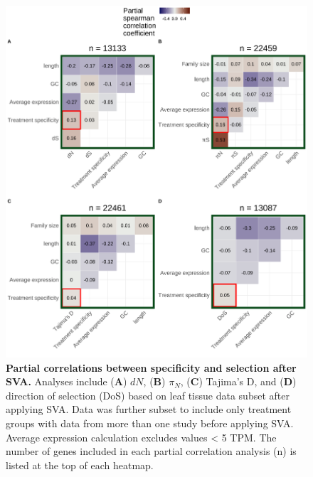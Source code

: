 \documentclass[12pt]{article}
\begin{document}
\begin{figure}[H]
\centering
\includegraphics[width=\linewidth]{figures/chapter_1/partialCorrelations_withoutTissueSpecificityAfterSVA_leaf_2023-02-21.pdf}
\caption{\textbf{Partial correlations between specificity and selection after SVA.} Analyses include (\textbf{A}) $dN$, (\textbf{B}) $\pi_N$, (\textbf{C}) Tajima's D, and (\textbf{D}) direction of selection (DoS) based on leaf tissue data subset after applying SVA. Data was further subset to include only treatment groups with data from more than one study before applying SVA. Average expression calculation excludes values < 5 TPM. The number of genes included in each partial correlation analysis (n) is listed at the top of each heatmap.}%
\label{fig:pcorTissueSubsetsAfterSVA}
\end{figure}
\end{document}
